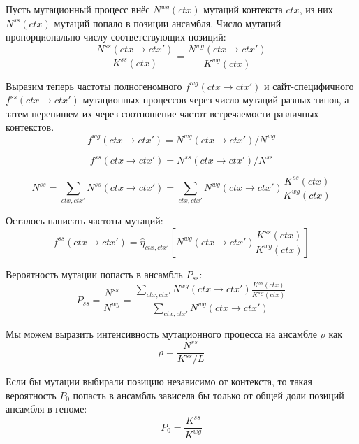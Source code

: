 \documentclass[a4paper]{article}
\begin{document}
Пусть мутационный процесс внёс $N^{wg}(ctx)$ мутаций контекста $ctx$, из них $N^{ss}(ctx)$ мутаций попало в позиции ансамбля. Число мутаций пропорционально числу соответствующих позиций:
\begin{equation}
\frac{N^{ss}(ctx \to ctx')}{K^{ss}(ctx)} = \frac{N^{wg}(ctx \to ctx')}{K^{wg}(ctx)}
\end{equation}


Выразим теперь частоты полногеномного $f^{wg}(ctx\to ctx')$ и сайт-специфичного $f^{ss}(ctx\to ctx')$ мутационных процессов через число мутаций разных типов, а затем перепишем их через соотношение частот встречаемости различных контекстов.
\begin{equation}
f^{wg}(ctx \to ctx') = N^{wg}(ctx \to ctx') / N^{wg}
\end{equation}

\begin{equation}
f^{ss}(ctx \to ctx') = N^{ss}(ctx \to ctx') / N^{ss}
\end{equation}

\begin{equation}
N^{ss} = \sum_{ctx, ctx'} N^{ss}(ctx \to ctx') = \sum_{ctx, ctx'} N^{wg}(ctx \to ctx') \frac{K^{ss}(ctx)}{K^{wg}(ctx)}
\end{equation}

Осталось написать частоты мутаций:
\begin{equation}
	f^{ss}(ctx \to ctx') = \widehat{\eta}_{ctx,ctx'}\left[ N^{wg}(ctx \to ctx') \frac{K^{ss}(ctx)}{K^{wg}(ctx)} \right]
\end{equation}

Вероятность мутации попасть в ансамбль $P_{ss}$:
\begin{equation}
	P_{ss} = \frac{N^{ss}}{N^{wg}} = \frac{ \sum_{ctx, ctx'} N^{wg}(ctx \to ctx') \frac{K^{ss}(ctx)}{K^{wg}(ctx)} }{ \sum_{ctx, ctx'}N^{wg}(ctx \to ctx') }
\end{equation}

Мы можем выразить интенсивность мутационного процесса на ансамбле $\rho$ как
\begin{equation}
	\rho = \frac{N^{ss}}{K^{ss} / L}
\end{equation}


Если бы мутации выбирали позицию независимо от контекста, то такая вероятность $P_0$ попасть в ансамбль зависела бы только от общей доли позиций ансамбля в геноме:
\begin{equation}
	P_0 = \frac{K^{ss}}{K^{wg}}
\end{equation}
\end{document}

